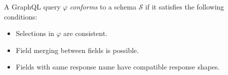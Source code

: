 \begin{definition}
A GraphQL query $\varphi$ \textit{conforms} to a schema $\mathcal{S}$ if it satisfies the following conditions:
\begin{itemize}
    \item Selections in $\varphi$ are consistent.

    \item Field merging between fields is possible.

    \item Fields with same response name have compatible response shapes.
\end{itemize}
\end{definition}

